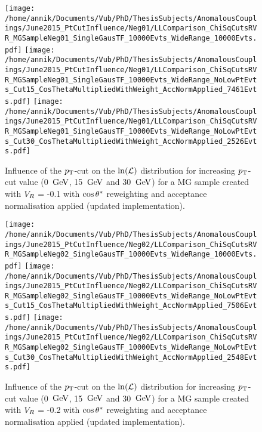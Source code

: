 \begin{figure}[h!t]
 \centering
 \texttt{[image: /home/annik/Documents/Vub/PhD/ThesisSubjects/AnomalousCouplings/June2015\_PtCutInfluence/Neg01/LLComparison\_ChiSqCutsRVR\_MGSampleNeg01\_SingleGausTF\_10000Evts\_WideRange\_10000Evts.pdf]}
 \texttt{[image: /home/annik/Documents/Vub/PhD/ThesisSubjects/AnomalousCouplings/June2015\_PtCutInfluence/Neg01/LLComparison\_ChiSqCutsRVR\_MGSampleNeg01\_SingleGausTF\_10000Evts\_WideRange\_NoLowPtEvts\_Cut15\_CosThetaMultipliedWithWeight\_AccNormApplied\_7461Evts.pdf]}
 \texttt{[image: /home/annik/Documents/Vub/PhD/ThesisSubjects/AnomalousCouplings/June2015\_PtCutInfluence/Neg01/LLComparison\_ChiSqCutsRVR\_MGSampleNeg01\_SingleGausTF\_10000Evts\_WideRange\_NoLowPtEvts\_Cut30\_CosThetaMultipliedWithWeight\_AccNormApplied\_2526Evts.pdf]}
 \caption{Influence of the $p_{\textrm T}$-cut on the $\ln(\mathcal{L})$ distribution for increasing $p_{\textrm T}$-cut value (0 $\, \mathrm{GeV}$, 15 $\, \mathrm{GeV}$ and 30 $\, \mathrm{GeV}$) for a MG sample created with $V_{R}$ = -0.1 with $\cos \theta^{*}$ reweighting and acceptance normalisation applied (updated implementation).}
 \label{fig::AccNormCosNeg01Update}
\end{figure}

\begin{figure}[h!t]
 \centering
 \texttt{[image: /home/annik/Documents/Vub/PhD/ThesisSubjects/AnomalousCouplings/June2015\_PtCutInfluence/Neg02/LLComparison\_ChiSqCutsRVR\_MGSampleNeg02\_SingleGausTF\_10000Evts\_WideRange\_10000Evts.pdf]}
 \texttt{[image: /home/annik/Documents/Vub/PhD/ThesisSubjects/AnomalousCouplings/June2015\_PtCutInfluence/Neg02/LLComparison\_ChiSqCutsRVR\_MGSampleNeg02\_SingleGausTF\_10000Evts\_WideRange\_NoLowPtEvts\_Cut15\_CosThetaMultipliedWithWeight\_AccNormApplied\_7506Evts.pdf]}
 \texttt{[image: /home/annik/Documents/Vub/PhD/ThesisSubjects/AnomalousCouplings/June2015\_PtCutInfluence/Neg02/LLComparison\_ChiSqCutsRVR\_MGSampleNeg02\_SingleGausTF\_10000Evts\_WideRange\_NoLowPtEvts\_Cut30\_CosThetaMultipliedWithWeight\_AccNormApplied\_2548Evts.pdf]}
 \caption{Influence of the $p_{\textrm T}$-cut on the $\ln(\mathcal{L})$ distribution for increasing $p_{\textrm T}$-cut value (0 $\, \mathrm{GeV}$, 15 $\, \mathrm{GeV}$ and 30 $\, \mathrm{GeV}$) for a MG sample created with $V_{R}$ = -0.2 with $\cos \theta^{*}$ reweighting and acceptance normalisation applied (updated implementation).}
 \label{fig::AccNormCosNeg02Update}
\end{figure}

